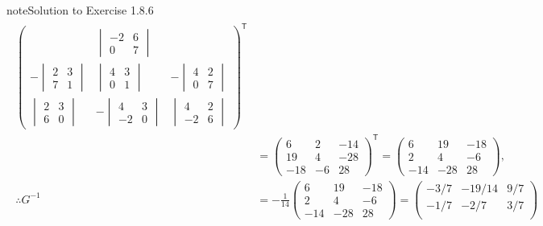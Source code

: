 \documentclass[letterpaper,10pt,english]{jupyterBook}
\begin{document}
\begin{sphinxadmonition}{note}{Solution to Exercise 1.8.6}
\begin{equation*}
\begin{split}
\begin{align*}
\begin{pmatrix}
        &
          \begin{vmatrix} -2 & 6 \\ 0 & 7 \end{vmatrix}
        \\
        - \begin{vmatrix} 2 & 3 \\ 7 & 1 \end{vmatrix}
        &
          \begin{vmatrix} 4 & 3 \\ 0 & 1 \end{vmatrix}
        &
        - \begin{vmatrix} 4 & 2 \\ 0 & 7 \end{vmatrix}
        \\
          \begin{vmatrix} 2 & 3 \\ 6 & 0 \end{vmatrix}
        &
        - \begin{vmatrix} 4 & 3 \\ -2 & 0 \end{vmatrix}
        &
          \begin{vmatrix} 4 & 2 \\ -2 & 6 \end{vmatrix}
    \end{pmatrix}^\mathsf{T} \\   
    &=
    \begin{pmatrix}
          6 &  2 & -14 \\
         19 &  4 & -28 \\
        -18 & -6 &  28 
    \end{pmatrix}^\mathsf{T}
    =
    \begin{pmatrix}
          6 &  19 & -18 \\
          2 &   4 &  -6 \\
        -14 & -28 &  28
    \end{pmatrix}, \\
    \therefore G^{-1} 
    &= -\frac{1}{14}
    \begin{pmatrix}
          6 &  19 & -18 \\
          2 &   4 &  -6 \\
        -14 & -28 &  28
    \end{pmatrix}
    =
    \begin{pmatrix}
        -3/7 & -19/14 &  9/7 \\
        -1/7 &  -2/7  &  3/7 \\

\end{pmatrix}
\end{align*}
\end{split}
\end{equation*}
\end{sphinxadmonition}
\end{document}
